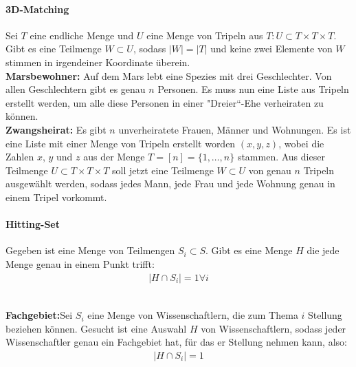 \paragraph{3D-Matching} Sei \(T\) eine endliche Menge und \(U\) eine Menge von Tripeln aus \(T: U \subset T \times T \times T\). Gibt es eine Teilmenge \(W \subset U\), sodass \(\vert W \vert = \vert T \vert\) und keine zwei Elemente von \(W\) stimmen in irgendeiner Koordinate überein.\\
\textbf{Marsbewohner:} Auf dem Mars lebt eine Spezies mit drei Geschlechter. Von allen Geschlechtern gibt es genau \(n\) Personen. Es muss nun eine Liste aus Tripeln erstellt werden, um alle diese Personen in einer "{}Dreier“{}-Ehe verheiraten zu können.\\
\textbf{Zwangsheirat:} Es gibt \(n\) unverheiratete Frauen, Männer und Wohnungen. Es ist eine Liste mit einer Menge von Tripeln erstellt worden \((x,y,z)\), wobei die Zahlen \(x\), \(y\) und \(z\) aus der Menge \(T = [n] = \{1, \ldots, n\} \) stammen. Aus dieser Teilmenge \(U \subset T \times T \times T \) soll jetzt eine Teilmenge \(W \subset U\) von genau \(n\) Tripeln ausgewählt werden, sodass jedes Mann, jede Frau und jede Wohnung genau in einem Tripel vorkommt.
\paragraph{Hitting-Set} Gegeben ist eine Menge von Teilmengen \(S_i \subset S\). Gibt es eine Menge \(H\) die jede Menge genau in einem Punkt trifft:
\begin{align*}
    \vert H \cap S_i \vert = 1\forall i
\end{align*}
\\
\textbf{Fachgebiet:}Sei \(S_i\) eine Menge von Wissenschaftlern, die zum Thema \(i\) Stellung beziehen können. Gesucht ist eine Auswahl \(H\) von Wissenschaftlern, sodass jeder Wissenschaftler genau ein Fachgebiet hat, für das er Stellung nehmen kann, also:
\begin{align*}
    \vert H \cap S_i \vert = 1
\end{align*}
